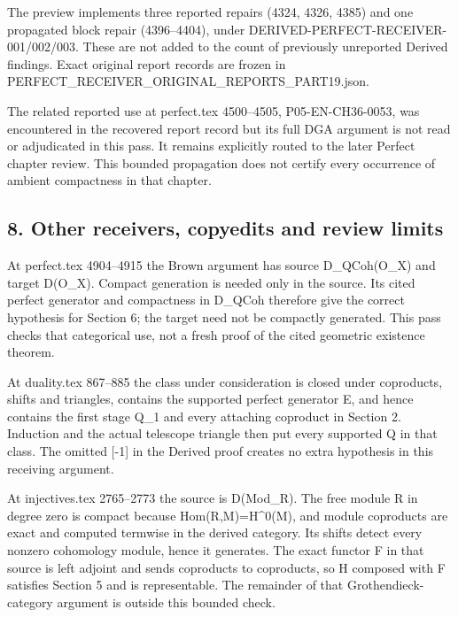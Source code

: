 The preview implements three reported repairs (4324,\allowbreak{} 4326,\allowbreak{} 4385)\allowbreak{} and one propagated block repair (4396–\allowbreak{}4404)\allowbreak{},\allowbreak{} under DERIVED-PERFECT-RECEIVER-001/\allowbreak{}002/\allowbreak{}003. These are not added to the count of previously unreported Derived findings. Exact original report records are frozen in PERFECT\_\allowbreak{}RECEIVER\_\allowbreak{}ORIGINAL\_\allowbreak{}REPORTS\_\allowbreak{}PART19.json.

The related reported use at perfect.tex 4500–\allowbreak{}4505,\allowbreak{} P05-EN-CH36-0053,\allowbreak{} was encountered in the recovered report record but its full DGA argument is not read or adjudicated in this pass. It remains explicitly routed to the later Perfect chapter review. This bounded propagation does not certify every occurrence of ambient compactness in that chapter.

\subsection{\texorpdfstring{8. Other receivers,\allowbreak{} copyedits and review limits}{8. Other  copyedits and review limits}}\label{proofs-11121-11450-other-receivers-copyedits-and-review-limits}

At perfect.tex 4904–\allowbreak{}4915 the Brown argument has source D\_\allowbreak{}QCoh(O\_\allowbreak{}X)\allowbreak{} and target D(O\_\allowbreak{}X)\allowbreak{}. Compact generation is needed only in the source. Its cited perfect generator and compactness in D\_\allowbreak{}QCoh therefore give the correct hypothesis for Section 6; the target need not be compactly generated. This pass checks that categorical use,\allowbreak{} not a fresh proof of the cited geometric existence theorem.

At duality.tex 867–\allowbreak{}885 the class under consideration is closed under coproducts,\allowbreak{} shifts and triangles,\allowbreak{} contains the supported perfect generator E,\allowbreak{} and hence contains the first stage Q\_\allowbreak{}1 and every attaching coproduct in Section 2. Induction and the actual telescope triangle then put every supported Q in that class. The omitted [-1]\allowbreak{} in the Derived proof creates no extra hypothesis in this receiving argument.

At injectives.tex 2765–\allowbreak{}2773 the source is D(Mod\_\allowbreak{}R)\allowbreak{}. The free module R in degree zero is compact because Hom(R,\allowbreak{}M)\allowbreak{}\allowbreak{}=H\textasciicircum{}0(M)\allowbreak{},\allowbreak{} and module coproducts are exact and computed termwise in the derived category. Its shifts detect every nonzero cohomology module,\allowbreak{} hence it generates. The exact functor F in that source is left adjoint and sends coproducts to coproducts,\allowbreak{} so H composed with F satisfies Section 5 and is representable. The remainder of that Grothendieck-category argument is outside this bounded check.


